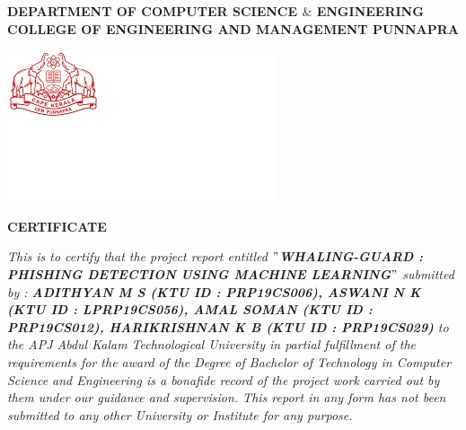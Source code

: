 



\begin{titlepage}
	\begin{center}
		\textbf{DEPARTMENT OF COMPUTER SCIENCE $\&$ ENGINEERING}\\[0.5cm]
		\textbf{ COLLEGE OF ENGINEERING AND MANAGEMENT PUNNAPRA}\\
		\vspace{1cm}
			\begin{center}
	\hspace{5cm}
	    	\includegraphics[]{am2.jpg}
	\end{center}

		\vspace{1cm}
		\textbf{CERTIFICATE}\\
	\end{center}
	\textit{\emph{This is to certify that the project report entitled {\textbf{$"$WHALING-GUARD : PHISHING DETECTION USING MACHINE LEARNING$"$}} submitted  by :  \textbf{ADITHYAN M S (KTU ID : PRP19CS006), ASWANI N K (KTU ID : LPRP19CS056), AMAL SOMAN (KTU ID : PRP19CS012), HARIKRISHNAN K B (KTU ID : PRP19CS029)} to the APJ Abdul Kalam Technological University in partial fulfillment of the requirements for the award of the Degree of Bachelor of Technology in Computer Science and Engineering is a bonafide record of the project work carried out by them under our guidance and supervision. This report in any form  has not been submitted to any other University or Institute for any purpose. }}\\\\\\
 

\end{titlepage}
